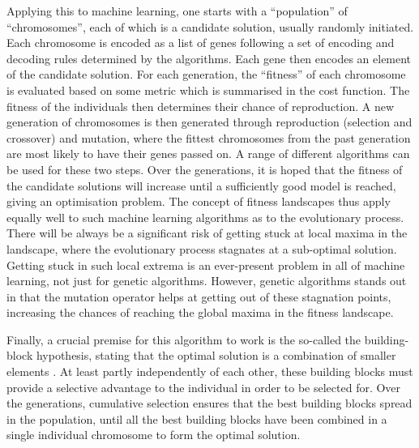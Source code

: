 \documentclass[multicolumn, 9pt]{extarticle}
\begin{document}
Applying this to machine learning, one starts with a ``population'' of ``chromosomes'', each of which is a candidate solution, usually randomly initiated. Each chromosome is encoded as a list of genes following a set of encoding and decoding rules determined by the algorithms. Each gene then encodes an element of the candidate solution. For each generation, the ``fitness'' of each chromosome is evaluated based on some metric which is summarised in the cost function. The fitness of the individuals then determines their chance of reproduction.
A new generation of chromosomes is then generated through reproduction (selection and crossover) and mutation, where the fittest chromosomes from the past generation are most likely to have their genes passed on. A range of different algorithms can be used for these two steps. Over the generations, it is hoped that the fitness of the candidate solutions will increase until a sufficiently good model is reached, giving an optimisation problem. The concept of fitness landscapes thus apply equally well to such machine learning algorithms as to the evolutionary process. There will be always be a significant risk of getting stuck at local maxima in the landscape, where the evolutionary process stagnates at a sub-optimal solution. Getting stuck in such local extrema is an ever-present problem in all of machine learning, not just for genetic algorithms. However, genetic algorithms stands out in that the mutation operator helps at getting out of these stagnation points, increasing the chances of reaching the global maxima in the fitness landscape.

Finally, a crucial premise for this algorithm to work is the so-called the building-block hypothesis, stating that the optimal solution is a combination of smaller elements \cite{Eyal}. At least partly independently of each other, these building blocks must provide a selective advantage to the individual in order to be selected for. Over the generations, cumulative selection ensures that the best building blocks spread in the population, until all the best building blocks have been combined in a single individual chromosome to form the optimal solution.
\end{document}
